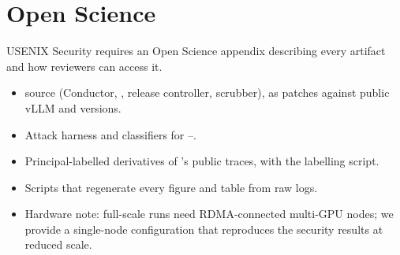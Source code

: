 \section{Open Science}
\label{app:openscience}

USENIX Security requires an Open Science appendix describing every artifact and
how reviewers can access it. 
\begin{itemize}
\item \sys source (Conductor, \vcd, release controller, scrubber), as patches
  against public vLLM and \mc versions.
\item Attack harness and classifiers for --.
\item Principal-labelled derivatives of \mc's public traces, with the labelling
  script.
\item Scripts that regenerate every figure and table from raw logs.
\item Hardware note: full-scale runs need RDMA-connected multi-GPU nodes; we
  provide a single-node configuration that reproduces the security results at
  reduced scale.
\end{itemize}
